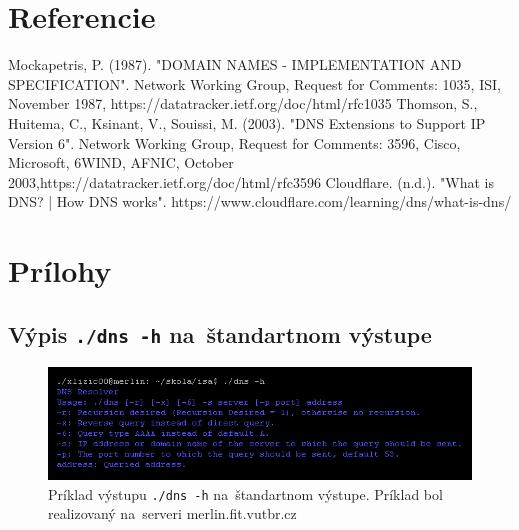 \documentclass[a4paper, 11pt]{article}
\begin{document}
	\section{Referencie}
	Mockapetris, P. (1987). "DOMAIN NAMES - IMPLEMENTATION AND SPECIFICATION". Network Working Group, Request for Comments: 1035, ISI, November 1987, https://datatracker.ietf.org/doc/html/rfc1035\newline\newline
	Thomson, S., Huitema, C., Ksinant, V., Souissi, M. (2003). "DNS Extensions to Support IP Version 6". Network Working Group, Request for Comments: 3596, Cisco, Microsoft, 6WIND, AFNIC, October 2003,\newline https://datatracker.ietf.org/doc/html/rfc3596\newline\newline
	Cloudflare. (n.d.). "What is DNS? | How DNS works". https://www.cloudflare.com/learning/dns/what-is-dns/ \newline\newline

	\clearpage
	\section{Prílohy}
	
	\subsection{Výpis \texttt{./dns -h} na~štandartnom výstupe}
	\label{subsection:res_A}
	\begin{figure}[ht]
		\centering
		\includegraphics[width=1 \linewidth]{res/A.png}

		\caption{Príklad výstupu \texttt{./dns -h} na~štandartnom výstupe. Príklad bol realizovaný na~serveri \mbox{merlin.fit.vutbr.cz}}
	\end{figure}

	\newpage
\end{document}
